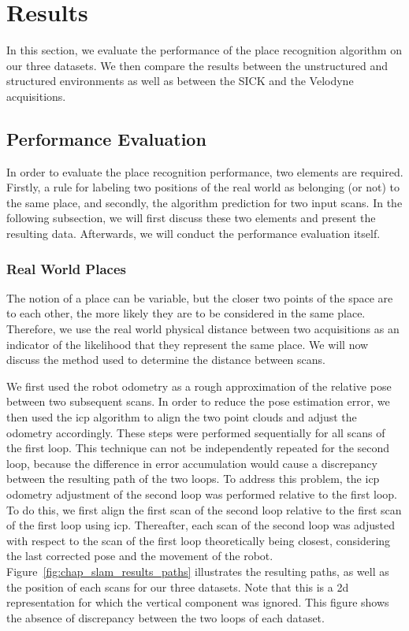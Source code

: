 \section{Results}
\label{sec:chap_slam_results}

In this section, we evaluate the performance of the place recognition algorithm on our three datasets. We then compare the results between the unstructured and structured environments as well as between the SICK and the Velodyne acquisitions. 

\subsection{Performance Evaluation}
\label{ssec:chap_slam_performance_evaluation}

In order to evaluate the place recognition performance, two elements are required. Firstly, a rule for labeling two positions of the real world as belonging (or not) to the same place, and secondly, the algorithm prediction for two input scans. In the following subsection, we will first discuss these two elements and present the resulting data. Afterwards, we will conduct the performance evaluation itself.


\subsubsection{Real World Places}
The notion of a place can be variable, but the closer two points of the space are to each other, the more likely they are to be considered in the same place. Therefore, we use the real world physical distance between two acquisitions as an indicator of the likelihood that they represent the same place. We will now discuss the method used to determine the distance between scans. 

We first used the robot odometry as a rough approximation of the relative pose between two subsequent scans. In order to reduce the pose estimation error, we then used the \gls*{icp} algorithm to align the two point clouds and adjust the odometry accordingly. These steps were performed sequentially for all scans of the first loop. This technique can not be independently repeated for the second loop, because the difference in error accumulation would cause a discrepancy between the resulting path of the two loops. To address this problem, the \gls*{icp} odometry adjustment of the second loop was performed relative to the first loop. To do this, we first align the first scan of the second loop relative to the first scan of the first loop using \gls*{icp}. Thereafter, each scan of the second loop was adjusted with respect to the scan of the first loop theoretically being closest, considering the last corrected pose and the movement of the robot. Figure~\ref{fig:chap_slam_results_paths} illustrates the resulting paths, as well as the position of each scans for our three datasets. Note that this is a \gls*{2d} representation for which the vertical component was ignored. This figure shows the absence of discrepancy between the two loops of each dataset.

